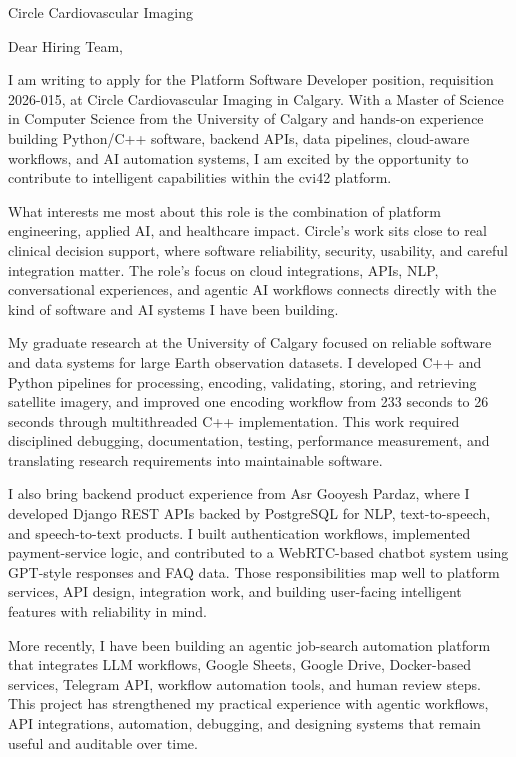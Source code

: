 \documentclass[11pt]{letter}
\begin{document}
\begin{letter}{Circle Cardiovascular Imaging}

\opening{Dear Hiring Team,}

I am writing to apply for the Platform Software Developer position, requisition 2026-015, at Circle Cardiovascular Imaging in Calgary. With a Master of Science in Computer Science from the University of Calgary and hands-on experience building Python/C++ software, backend APIs, data pipelines, cloud-aware workflows, and AI automation systems, I am excited by the opportunity to contribute to intelligent capabilities within the cvi42 platform.

What interests me most about this role is the combination of platform engineering, applied AI, and healthcare impact. Circle's work sits close to real clinical decision support, where software reliability, security, usability, and careful integration matter. The role's focus on cloud integrations, APIs, NLP, conversational experiences, and agentic AI workflows connects directly with the kind of software and AI systems I have been building.

My graduate research at the University of Calgary focused on reliable software and data systems for large Earth observation datasets. I developed C++ and Python pipelines for processing, encoding, validating, storing, and retrieving satellite imagery, and improved one encoding workflow from 233 seconds to 26 seconds through multithreaded C++ implementation. This work required disciplined debugging, documentation, testing, performance measurement, and translating research requirements into maintainable software.

I also bring backend product experience from Asr Gooyesh Pardaz, where I developed Django REST APIs backed by PostgreSQL for NLP, text-to-speech, and speech-to-text products. I built authentication workflows, implemented payment-service logic, and contributed to a WebRTC-based chatbot system using GPT-style responses and FAQ data. Those responsibilities map well to platform services, API design, integration work, and building user-facing intelligent features with reliability in mind.

More recently, I have been building an agentic job-search automation platform that integrates LLM workflows, Google Sheets, Google Drive, Docker-based services, Telegram API, workflow automation tools, and human review steps. This project has strengthened my practical experience with agentic workflows, API integrations, automation, debugging, and designing systems that remain useful and auditable over time.


\end{letter}
\end{document}

